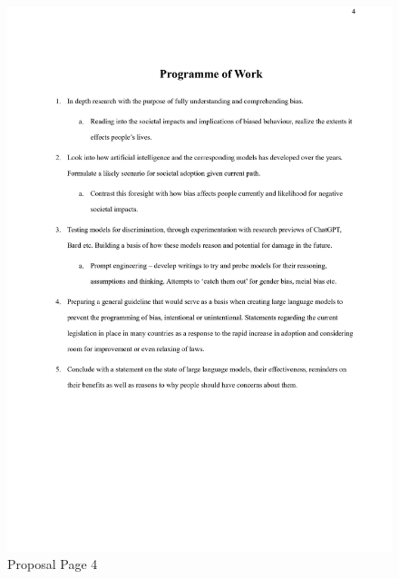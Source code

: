 \documentclass[12pt]{article}
\begin{document}
\begin{figure}[H]
    \centering
    \includegraphics[width=0.85\linewidth]{Images/0004.jpg}
    \caption{Proposal Page 4}
    
\end{figure}
\end{document}
